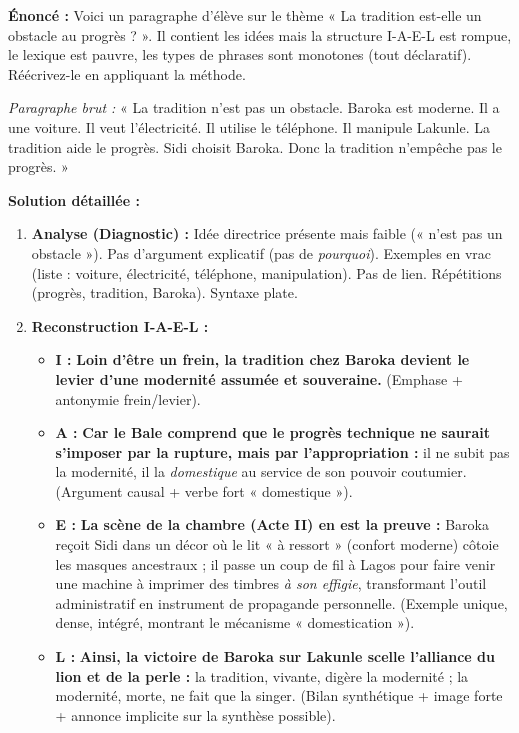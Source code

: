 \documentclass[11pt]{article}
\begin{document}
\begin{exoresolu}
\textbf{Énoncé :} Voici un paragraphe d'élève sur le thème « La tradition est-elle un obstacle au progrès ? ». Il contient les idées mais la structure I-A-E-L est rompue, le lexique est pauvre, les types de phrases sont monotones (tout déclaratif). Réécrivez-le en appliquant la méthode.

\textit{Paragraphe brut :}
« La tradition n'est pas un obstacle. Baroka est moderne. Il a une voiture. Il veut l'électricité. Il utilise le téléphone. Il manipule Lakunle. La tradition aide le progrès. Sidi choisit Baroka. Donc la tradition n'empêche pas le progrès. »

\textbf{Solution détaillée :}
\begin{enumerate}
    \item \textbf{Analyse (Diagnostic) :} Idée directrice présente mais faible (« n'est pas un obstacle »). Pas d'argument explicatif (pas de \emph{pourquoi}). Exemples en vrac (liste : voiture, électricité, téléphone, manipulation). Pas de lien. Répétitions (progrès, tradition, Baroka). Syntaxe plate.
    \item \textbf{Reconstruction I-A-E-L :}
    \begin{itemize}
        \item \textbf{I :} \textbf{Loin d'être un frein, la tradition chez Baroka devient le levier d'une modernité assumée et souveraine.} (Emphase + antonymie frein/levier).
        \item \textbf{A :} \textbf{Car le Bale comprend que le progrès technique ne saurait s'imposer par la rupture, mais par l'appropriation :} il ne subit pas la modernité, il la \emph{domestique} au service de son pouvoir coutumier. (Argument causal + verbe fort « domestique »).
        \item \textbf{E :} \textbf{La scène de la chambre (Acte II) en est la preuve :} Baroka reçoit Sidi dans un décor où le lit « à ressort » (confort moderne) côtoie les masques ancestraux ; il passe un coup de fil à Lagos pour faire venir une machine à imprimer des timbres \emph{à son effigie}, transformant l'outil administratif en instrument de propagande personnelle. (Exemple unique, dense, intégré, montrant le mécanisme « domestication »).
        \item \textbf{L :} \textbf{Ainsi, la victoire de Baroka sur Lakunle scelle l'alliance du lion et de la perle :} la tradition, vivante, digère la modernité ; la modernité, morte, ne fait que la singer. (Bilan synthétique + image forte + annonce implicite sur la synthèse possible).

\end{itemize}
\end{enumerate}
\end{exoresolu}
\end{document}
